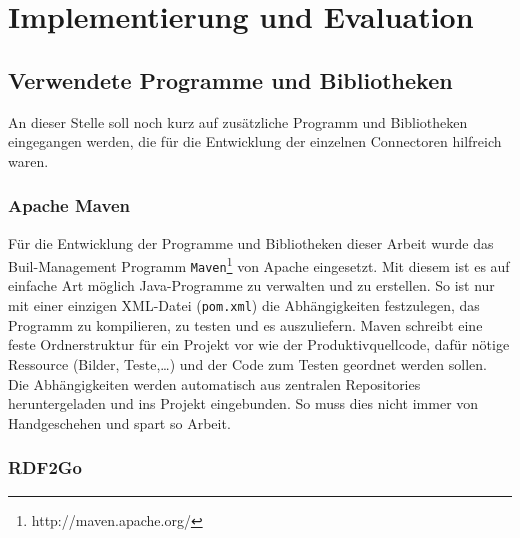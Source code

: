 
\chapter{Implementierung und Evaluation} %
\label{cha:implementierung_und_evaluation}


\section{Verwendete Programme und Bibliotheken} %
\label{sec:verwendete_bibliotheken_und_programme}

An dieser Stelle soll noch kurz auf zusätzliche Programm und Bibliotheken eingegangen werden, die für die Entwicklung der einzelnen Connectoren hilfreich waren. 

\subsection{Apache Maven} %
\label{sub:apache_maven}

Für die Entwicklung der Programme und Bibliotheken dieser Arbeit wurde das Buil-Management Programm \texttt{Maven}\footnote{http://maven.apache.org/} von Apache eingesetzt. Mit diesem ist es auf einfache Art möglich Java-Programme zu verwalten und zu erstellen. So ist nur mit einer einzigen XML-Datei (\texttt{pom.xml}) die Abhängigkeiten festzulegen, das Programm zu kompilieren, zu testen und es auszuliefern. Maven schreibt eine feste Ordnerstruktur für ein Projekt vor wie der Produktivquellcode, dafür nötige Ressource (Bilder, Teste,\dots) und der Code zum Testen geordnet werden sollen. Die Abhängigkeiten werden automatisch aus zentralen Repositories heruntergeladen und ins Projekt eingebunden. So muss dies nicht immer von Handgeschehen und spart so Arbeit.


\subsection{RDF2Go} %
\label{sub:rdf2go}



